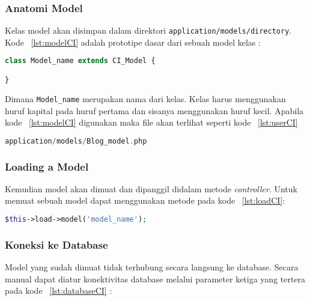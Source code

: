 \subsubsection{Anatomi Model}
\label{ss:anatomiModelCI}
Kelas model akan disimpan dalam direktori \texttt{application/models/directory}. Kode ~\ref{lst:modelCI} adalah prototipe dasar dari sebuah model kelas :

\begin{lstlisting}[style=customphp, language=PHP, basicstyle=\ttfamily, frame=single, columns=fullflexible, keepspaces=true, breaklines=true, showstringspaces=false, label={lst:modelCI}, caption=Struktur model pada codeIgniter.]  
class Model_name extends CI_Model {

}
\end{lstlisting}

Dimana \texttt{Model\_name} merupakan nama dari kelas. Kelas harus menggunakan huruf kapital pada huruf pertama dan sisanya menggunakan huruf kecil. Apabila kode ~\ref{lst:modelCI} digunakan maka file akan terlihat seperti kode ~\ref{lst:userCI}
\begin{lstlisting}[style=customphp, language=PHP, basicstyle=\ttfamily, frame=single, columns=fullflexible, keepspaces=true, breaklines=true, showstringspaces=false, label={lst:userCI}, caption=Contoh model codeIgniter.]  
application/models/Blog_model.php
\end{lstlisting}

\subsubsection{Loading a Model}
\label{ss:loadModelCI}
Kemudian model akan dimuat dan dipanggil didalam metode \textit{controller}. Untuk memuat sebuah model dapat menggunakan metode pada kode ~\ref{lst:loadCI}:

\begin{lstlisting}[style=customphp, language=PHP, basicstyle=\ttfamily, frame=single, columns=fullflexible, keepspaces=true, breaklines=true, showstringspaces=false, label={lst:loadCI}, caption=Contoh pemanggilan model pada codeIgniter.] 
$this->load->model('model_name');
\end{lstlisting}

\subsubsection{Koneksi ke Database}
\label{ss:databaseModelCI}
Model yang sudah dimuat tidak terhubung secara langsung ke database. Secara manual dapat diatur konektivitas database melalui parameter ketiga yang tertera pada kode ~\ref{lst:databaseCI} :


